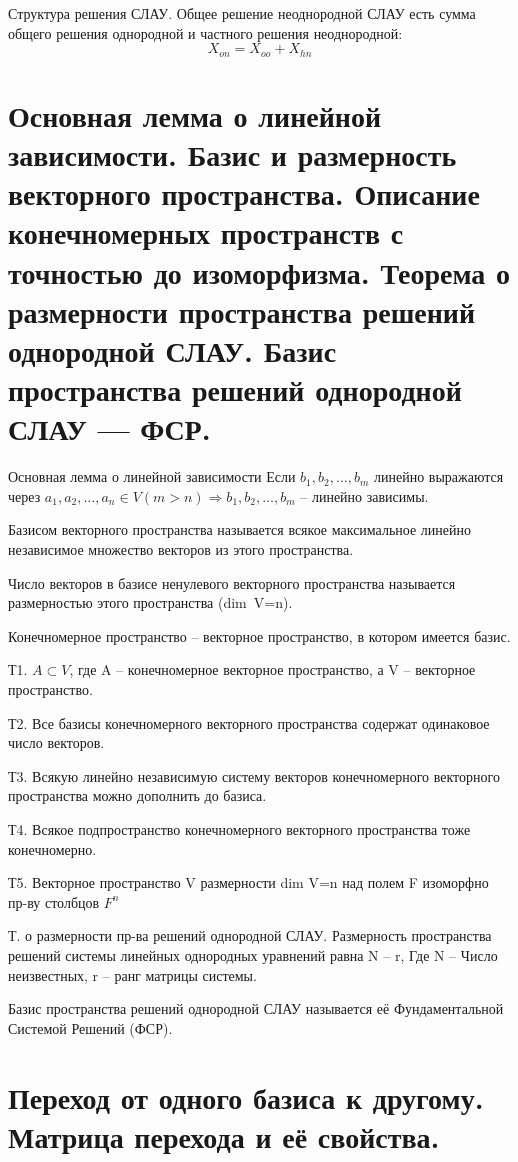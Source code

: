 \documentclass{article}
\begin{document}
\textsf{Структура решения СЛАУ.} Общее решение неоднородной СЛАУ есть сумма общего решения однородной и частного решения неоднородной:
$$X_{on}=X_{oo}+X_{hn}$$

\section{Основная лемма о линейной зависимости. Базис и размерность векторного пространства. Описание конечномерных пространств с точностью до изоморфизма. Теорема о размерности пространства решений однородной СЛАУ. Базис пространства решений однородной СЛАУ — ФСР.}

\textsf{Основная лемма о линейной зависимости}
Если $b_1,b_2,\dots,b_m$ линейно выражаются через $a_1,a_2,\dots,a_n\in V (m>n) \Rightarrow b_1,b_2,\dots,b_m$ – линейно зависимы.

\textsf{Базисом} векторного пространства называется всякое максимальное линейно независимое множество векторов из этого пространства.

Число векторов в базисе ненулевого векторного пространства называется \textsf{размерностью} этого пространства (dim\ V=n).

\textsf{Конечномерное пространство} – векторное пространство, в котором имеется базис.

Т1. $A\subset V$, где A – конечномерное векторное пространство, а V – векторное пространство.

Т2. Все базисы конечномерного векторного пространства содержат одинаковое число векторов.

Т3. Всякую линейно независимую систему векторов конечномерного векторного пространства можно дополнить до базиса.

Т4. Всякое подпространство конечномерного векторного пространства тоже конечномерно.

Т5. Векторное пространство V размерности dim V=n над полем F изоморфно пр-ву столбцов $F^n$

\textsf{Т. о размерности пр-ва решений однородной СЛАУ.} Размерность пространства решений системы линейных однородных уравнений равна N – r, Где N – Число неизвестных, r – ранг матрицы системы.

Базис пространства решений однородной СЛАУ называется её Фундаментальной Системой Решений (ФСР).

\section{Переход от одного базиса к другому. Матрица перехода и её свойства.}
\end{document}
